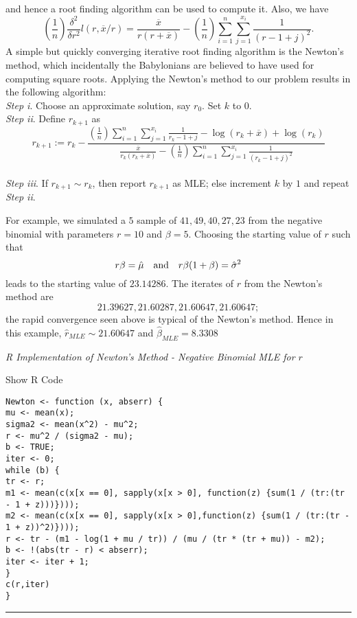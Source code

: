 \documentclass[]{book}
\theoremstyle{definition}
\theoremstyle{definition}
\theoremstyle{definition}
\theoremstyle{remark}
\begin{document}
and hence a root finding algorithm can be used to compute it. Also, we
have \[
\left(\frac{1}{n}\right)\frac{\delta^2}{\delta r^2}l(r,\overline{x}/r)=\frac{\overline{x}}{r(r+\overline{x})}-\left(\frac{1}{n}\right)\sum_{i=1}^n \sum_{j=1}^{x_i}\frac{1}{(r-1+j)^2}.
\] A simple but quickly converging iterative root finding algorithm is
the Newton's method, which incidentally the Babylonians are believed to
have used for computing square roots. Applying the Newton's method to
our problem results in the following algorithm:\\
 \emph{Step i}. Choose an approximate solution, say \(r_0\). Set \(k\)
to \(0\).\\
\emph{Step ii}. Define \(r_{k+1}\) as \[
r_{k+1}:= r_k - \frac{\left(\frac{1}{n}\right)\sum_{i=1}^n \sum_{j=1}^{x_i}\frac{1}{r_k-1+j} - \log(r_k+\overline{x}) + \log(r_k)}{\frac{\overline{x}}{r_k(r_k+\overline{x})}-\left(\frac{1}{n}\right)\sum_{i=1}^n \sum_{j=1}^{x_i}\frac{1}{(r_k-1+j)^2}}
\]\\
\emph{Step iii}. If \(r_{k+1}\sim r_k\), then report \(r_{k+1}\) as MLE;
else increment \(k\) by \(1\) and repeat \emph{Step ii}.

For example, we simulated a \(5\) sample of \(41, 49, 40, 27, 23\) from
the negative binomial with parameters \(r=10\) and \(\beta=5\). Choosing
the starting value of \(r\) such that \[
r\beta=\hat{\mu} \quad \hbox{and} \quad r\beta(1+\beta)=\hat{\sigma}^2
\] leads to the starting value of \(23.14286\). The iterates of \(r\)
from the Newton's method are \[
21.39627, 21.60287, 21.60647, 21.60647;
\] the rapid convergence seen above is typical of the Newton's method.
Hence in this example, \(\hat{r}_{MLE}\sim21.60647\) and
\(\hat{\beta}_{MLE}=8.3308\)

\emph{R Implementation of Newton's Method - Negative Binomial MLE for
\(r\)}

Show R Code

\hypertarget{toggleCodeFreq.1}{}
\begin{verbatim}
Newton <- function (x, abserr) {
mu <- mean(x);
sigma2 <- mean(x^2) - mu^2;
r <- mu^2 / (sigma2 - mu);
b <- TRUE;
iter <- 0;
while (b) {
tr <- r;
m1 <- mean(c(x[x == 0], sapply(x[x > 0], function(z) {sum(1 / (tr:(tr - 1 + z)))})));
m2 <- mean(c(x[x == 0], sapply(x[x > 0],function(z) {sum(1 / (tr:(tr - 1 + z))^2)})));
r <- tr - (m1 - log(1 + mu / tr)) / (mu / (tr * (tr + mu)) - m2);
b <- !(abs(tr - r) < abserr);
iter <- iter + 1;
}
c(r,iter)
}
\end{verbatim}

\begin{center}\rule{0.5\linewidth}{\linethickness}\end{center}
\end{document}
